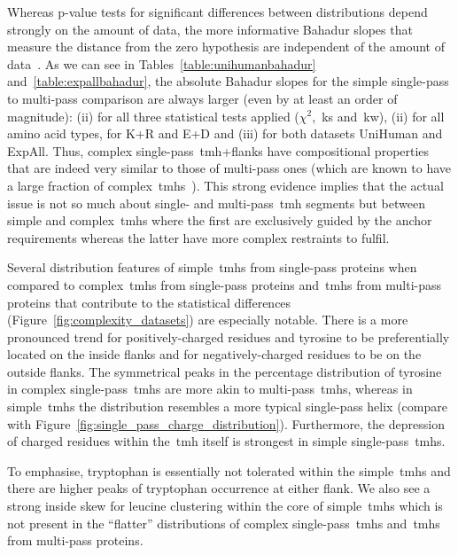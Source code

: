 Whereas p\--value tests for significant differences between distributions depend strongly on the amount of data, the more informative Bahadur slopes that measure the distance from the zero hypothesis are independent of the amount of data~\cite{Bahadur1967, Bahadur1971, Sunyaev1998}.
As we can see in Tables~\ref{table:unihumanbahadur} and~\ref{table:expallbahadur}, the absolute Bahadur slopes for the simple single\--pass to multi\--pass comparison are always larger (even by at least an order of magnitude): (ii) for all three statistical tests applied (\({\chi}^{2}\),~\gls{ks} and~\gls{kw}), (ii) for all amino acid types, for K+R and E+D and (iii) for both datasets UniHuman and ExpAll.
Thus, complex single\--pass~\gls{tmh}+flanks have compositional properties that are indeed very similar to those of multi\--pass ones (which are known to have a large fraction of complex~\gls{tmh}s~\cite{Wong2011, Wong2012}).
This strong evidence implies that the actual issue is not so much about single- and multi\--pass~\gls{tmh} segments but between simple and complex~\gls{tmh}s where the first are exclusively guided by the anchor requirements whereas the latter have more complex restraints to fulfil.

Several distribution features of simple~\gls{tmh}s from single\--pass proteins when compared to complex~\gls{tmh}s from single\--pass proteins and~\gls{tmh}s from multi\--pass proteins that contribute to the statistical differences (Figure~\ref{fig:complexity_datasets}) are especially notable.
There is a more pronounced trend for positively\--charged residues and tyrosine to be preferentially located on the inside flanks and for negatively\--charged residues to be on the outside flanks.
The symmetrical peaks in the percentage distribution of tyrosine in complex single\--pass~\gls{tmh}s are more akin to multi\--pass~\gls{tmh}s, whereas in simple~\gls{tmh}s the distribution resembles a more typical single\--pass helix (compare with Figure~\ref{fig:single_pass_charge_distribution}).
Furthermore, the depression of charged residues within the~\gls{tmh} itself is strongest in simple single\--pass~\gls{tmh}s.

To emphasise, tryptophan is essentially not tolerated within the simple~\gls{tmh}s and there are higher peaks of tryptophan occurrence at either flank.
We also see a strong inside skew for leucine clustering within the core of simple~\gls{tmh}s which is not present in the ``flatter'' distributions of complex single\--pass~\gls{tmh}s and~\gls{tmh}s from multi\--pass proteins.


